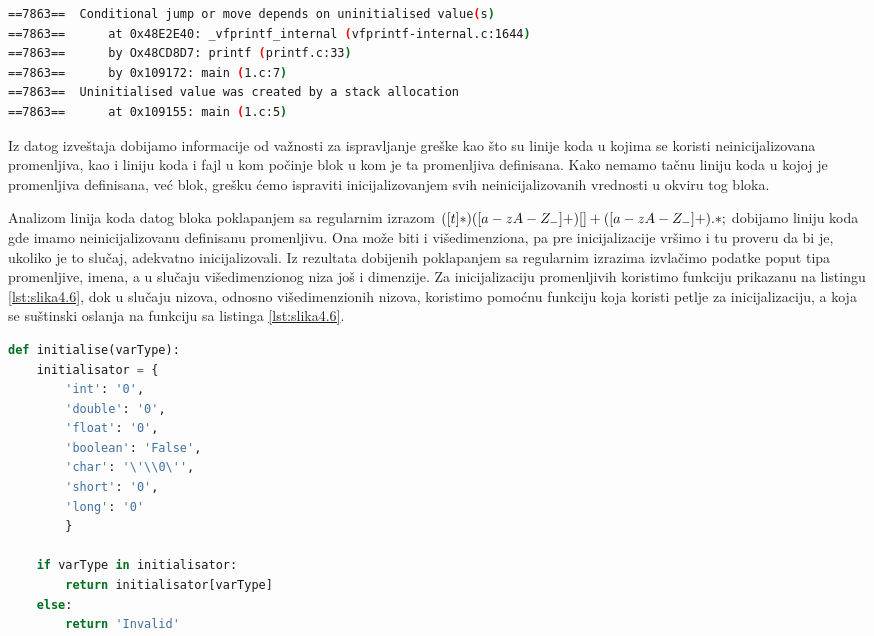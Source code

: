 \documentclass[12pt,oneside]{memoir}
\theoremstyle{plain}
\theoremstyle{definition}
\begin{document}
\begin{lstlisting}[style=terminal,caption={Ispis greške korišćenja statičke neinicijalizovane promenljive}, label={lst:slika4.5},language={bash}]   
==7863==  Conditional jump or move depends on uninitialised value(s)
==7863==      at 0x48E2E40: _vfprintf_internal (vfprintf-internal.c:1644) 
==7863==      by Ox48CD8D7: printf (printf.c:33)
==7863==      by 0x109172: main (1.c:7)
==7863==  Uninitialised value was created by a stack allocation
==7863==      at 0x109155: main (1.c:5)
\end{lstlisting}

Iz datog izveštaja dobijamo informacije od važnosti za ispravljanje greške kao što su linije koda u kojima se koristi neinicijalizovana promenljiva, kao i liniju koda i fajl u kom počinje blok u kom je ta promenljiva definisana. Kako nemamo tačnu liniju koda u kojoj je promenljiva definisana, već blok, grešku ćemo ispraviti inicijalizovanjem svih neinicijalizovanih vrednosti u okviru tog bloka. 

Analizom linija koda datog bloka poklapanjem sa regularnim izrazom $ ([ \\t]*)([a-zA-Z_-]+)[ ]+([a-zA-Z_-]+).*; $ dobijamo liniju koda gde imamo neinicijalizovanu definisanu promenljivu. Ona može biti i višedimenziona, pa pre inicijalizacije vršimo i tu proveru da bi je, ukoliko je to slučaj, adekvatno inicijalizovali. Iz rezultata dobijenih poklapanjem sa regularnim izrazima izvlačimo podatke poput tipa promenljive, imena, a u slučaju višedimenzionog niza još i dimenzije. Za inicijalizaciju promenljivih koristimo funkciju prikazanu na listingu \ref{lst:slika4.6}, dok u slučaju nizova, odnosno višedimenzionih nizova, koristimo pomoćnu funkciju koja koristi petlje za inicijalizaciju, a koja se suštinski oslanja na funkciju sa listinga \ref{lst:slika4.6}.

\begin{lstlisting}[style=mystyle,caption={Funkcija inicijalizacije}, label={lst:slika4.6},language={Python}] 
def initialise(varType):
	initialisator = {
		'int': '0',
		'double': '0',
		'float': '0',
		'boolean': 'False',
		'char': '\'\\0\'',
		'short': '0',
		'long': '0'
	    }
	
	if varType in initialisator:
		return initialisator[varType]
	else:
		return 'Invalid'
\end{lstlisting}

\end{document}
